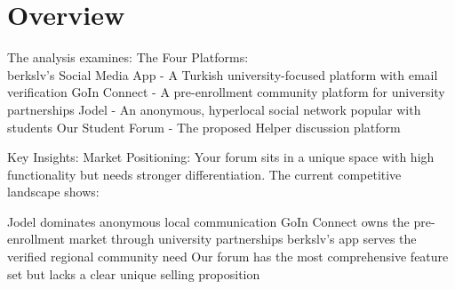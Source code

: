 \newpage

\section*{Overview}
The analysis examines:
The Four Platforms: \\ 
berkslv's Social Media App - A Turkish university-focused platform with email verification
GoIn Connect - A pre-enrollment community platform for university partnerships
Jodel - An anonymous, hyperlocal social network popular with students
Our Student Forum - The proposed Helper discussion platform

Key Insights:
Market Positioning: Your forum sits in a unique space with high functionality but needs stronger differentiation. The current competitive landscape shows:

Jodel dominates anonymous local communication
GoIn Connect owns the pre-enrollment market through university partnerships
berkslv's app serves the verified regional community need
Our forum has the most comprehensive feature set but lacks a clear unique selling proposition




